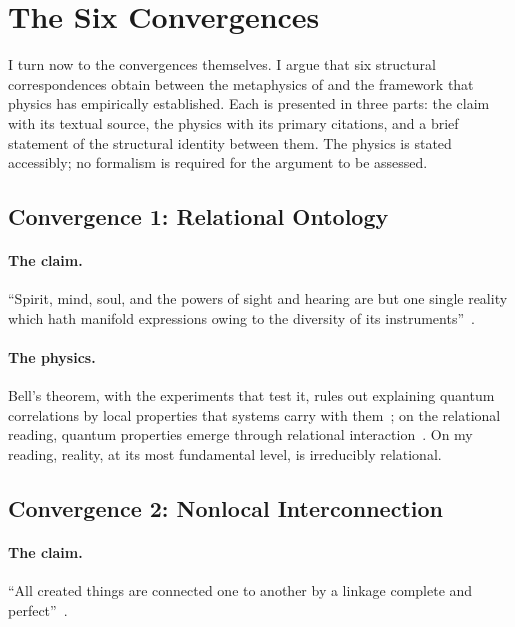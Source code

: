 
\section{The Six Convergences}
\label{sec:convergences}


I turn now to the convergences themselves.
I argue that six structural correspondences obtain between the \bahai metaphysics of
\mahabbat and the framework that physics has empirically established.
Each is presented in three parts: the \bahai claim with its textual source,
the physics with its primary citations, and a brief statement of the
structural identity between them.
The physics is stated accessibly; no formalism is required for the argument
to be assessed.

\subsection{Convergence 1: Relational Ontology}

\paragraph{The \bahai claim.}
``Spirit, mind, soul, and the powers of sight and hearing are but one single reality which hath manifold expressions owing to the diversity of its instruments''~\citep[para.~35]{SummonsLordHosts}.

\paragraph{The physics.}
Bell's theorem, with the experiments that test it, rules out explaining quantum
correlations by local properties that systems carry with them~\citep{Bell1964};
on the relational reading, quantum properties emerge through relational
interaction~\citep{Rovelli1996}.
On my reading, reality, at its most fundamental level, is irreducibly relational.

\subsection{Convergence 2: Nonlocal Interconnection}

\paragraph{The \bahai claim.}
``All created things are connected one to another by a linkage complete and
perfect''~\citep[\S 21]{SelectionsAbdul}.

